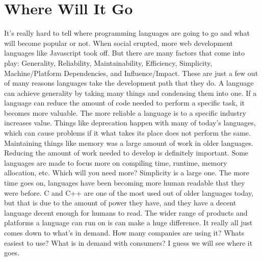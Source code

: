 \documentclass[letterpaper, 10 pt, conference]{IEEEtran}
\begin{document}
\section{Where Will It Go}
\indent It's really hard to tell where programming languages are going to go and what will become popular or not. When social erupted, more web development languages like Javascript took off. But there are many factors that come into play: Generality, Reliability, Maintainability, Efficiency, Simplicity, Machine/Platform Dependencies, and Influence/Impact. These are just a few out of many reasons languages take the development path that they do. A language can achieve generality by taking many things and condensing them into one. If a language can reduce the amount of code needed to perform a specific task, it becomes more valuable. The more reliable a language is to a specific industry increases value. Things like deprecation happen with many of today's languages, which can cause problems if it what takes its place does not perform the same. Maintaining things like memory was a large amount of work in older languages. Reducing the amount of work needed to develop is definitely important. Some languages are made to focus more on compiling time, runtime, memory allocation, etc. Which will you need more? Simplicity is a large one. The more time goes on, languages have been becoming more human readable that they were before. C and C++ are one of the most used out of older languages today, but that is due to the amount of power they have, and they have a decent language decent enough for humans to read. The wider range of products and platforms a language can run on is can make a huge difference. It really all just comes down to what's in demand. How many companies are using it? Whats easiest to use? What is in demand with consumers? I guess we will see where it goes.
\end{document}

